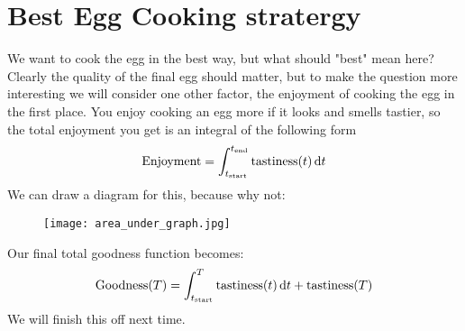 
\startEntry{}
\section{Best Egg Cooking stratergy}
We want to cook the egg in the best way, but what should "best" mean here? Clearly the quality of the final egg should matter, but to make the question more interesting we will consider one other factor, the enjoyment of cooking the egg in the first place. You enjoy cooking an egg more if it looks and smells tastier, so the total enjoyment you get is an integral of the following form \[ \text{Enjoyment} = \int_{t_\text{start}}^{t_\text{end}} \text{tastiness}(t) \,\dx[t]\]
We can draw a diagram for this, because why not:
\begin{figure}[h]
\texttt{[image: area\_under\_graph.jpg]}
\end{figure}


Our final total goodness function becomes:
\[ \text{Goodness}(T) = \int_{t_\text{start}}^{T} \text{tastiness}(t) \,\dx[t] + \text{tastiness}(T) \]
We will finish this off next time.
\finishEntry{}